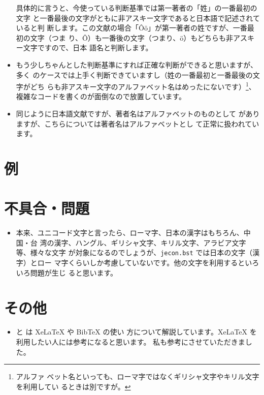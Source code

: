 \documentclass[a4paper,10pt]{bxjsarticle}
\begin{document}
\begin{itemize}
       具体的に言うと、今使っている判断基準では第一著者の「姓」の一番最初の文字
       と一番最後の文字がともに非アスキー文字であると日本語で記述されていると判
       断します。この文献の場合「Ôö」が第一著者の姓ですが、一番最初の文字（つま
       り、Ô）も一番後の文字（つまり、ö）もどちらも非アスキー文字ですので、日本
       語名と判断します。
 \item もう少しちゃんとした判断基準にすれば正確な判断ができると思いますが、多く
       のケースでは上手く判断できていますし（姓の一番最初と一番最後の文字がどち
       らも非アスキー文字のアルファベット名はめったにないです）\footnote{アルファ
       ベット名といっても、ローマ字ではなくギリシャ文字やキリル文字を利用してい
       るときは別ですが。}、複雑なコードを書くのが面倒なので放置しています。
 \item 同じように日本語文献ですが、著者名はアルファベットのものとして
       \citet{Ryza2016} がありますが、こちらについては著者名はアルファベットとし
       て正常に扱われています。
\end{itemize}

\section{例}




\section{不具合・問題}

\begin{itemize}
 \item 本来、ユニコード文字と言ったら、ローマ字、日本の漢字はもちろん、中国・台
       湾の漢字、ハングル、ギリシャ文字、キリル文字、アラビア文字等、様々な文字
       が対象になるのでしょうが、\texttt{jecon.bst} では日本の文字（漢字）とロー
       マ字くらいしか考慮していないです。他の文字を利用するといろいろ問題が生じ
       ると思います。
\end{itemize}


\section{その他}

\begin{itemize}
 \item \citet{120005614155} と \citet{120005678435} は XeLaTeX や BibTeX の使い
       方について解説しています。XeLaTeX を利用したい人には参考になると思います。
       私も参考にさせていただきました。
\end{itemize}

\vspace*{2em}

\nocite{*}



%

\end{document}
